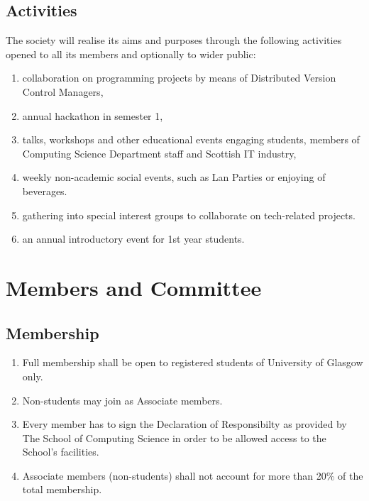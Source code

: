 \documentclass{report}
\begin{document}
	\section{Activities}

		The society will realise its aims and purposes through the following activities opened to all its members and optionally to wider public:

		\begin{enumerate}
			\item{collaboration on programming projects by means of Distributed Version Control Managers,}
			\item{annual hackathon in semester 1,}
			\item{talks, workshops and other educational events engaging students, members of Computing Science Department staff and Scottish IT industry,}
			\item{weekly non-academic social events, such as Lan Parties or enjoying of beverages.}
			\item{gathering into special interest groups to collaborate on tech-related projects.}
			\item{an annual introductory event for 1st year students.}
		\end{enumerate}

\chapter{Members and Committee}

\section{Membership}

	\begin{enumerate}
		\item{Full membership shall be open to registered students of University of Glasgow only.}
		\item{Non-students may join as Associate members.}
		\item{Every member has to sign the Declaration of Responsibilty as provided by The School of Computing Science in order to be allowed access to the School's facilities.}
		\item{Associate members (non-students) shall not account for more than 20\% of the total membership.}
	\end{enumerate}
\end{document}
